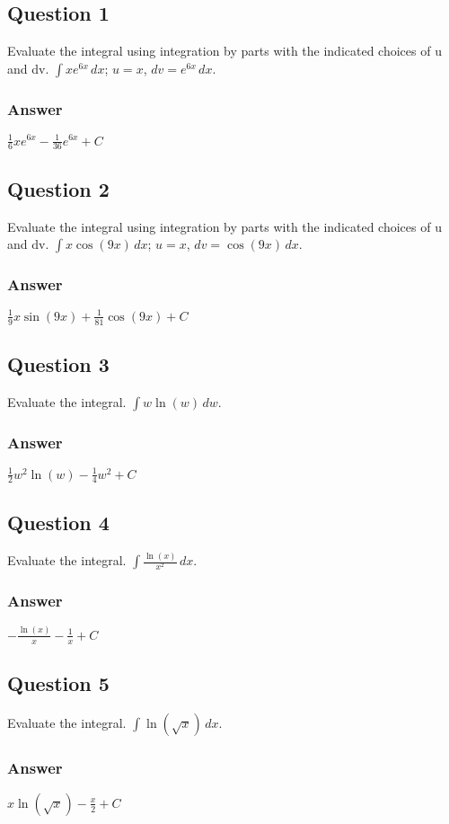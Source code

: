 \documentclass{article}
\begin{document}
\subsection*{Question 1}
Evaluate the integral using integration by parts with the indicated choices of u and dv. $\int xe^{6x} \,dx$; $u=x$, $dv=e^{6x}\,dx$.
\subsubsection*{Answer}
$ \frac{1}{6}xe^{6x} - \frac{1}{36}e^{6x} + C $

\subsection*{Question 2}
Evaluate the integral using integration by parts with the indicated choices of u and dv. $\int x\cos(9x) \,dx$; $u=x$, $dv=\cos(9x)\,dx$.
\subsubsection*{Answer}
$ \frac{1}{9}x\sin(9x) + \frac{1}{81}\cos(9x) + C $

\subsection*{Question 3}
Evaluate the integral. $\int w\ln(w) \,dw$.
\subsubsection*{Answer}
$ \frac{1}{2}w^2\ln(w) - \frac{1}{4}w^2 + C $

\subsection*{Question 4}
Evaluate the integral. $\int \frac{\ln(x)}{x^2} \,dx$.
\subsubsection*{Answer}
$ -\frac{\ln(x)}{x} - \frac{1}{x} + C $

\subsection*{Question 5}
Evaluate the integral. $\int \ln(\sqrt{x}) \,dx$.
\subsubsection*{Answer}
$ x\ln(\sqrt{x}) - \frac{x}{2} + C $
\end{document}
